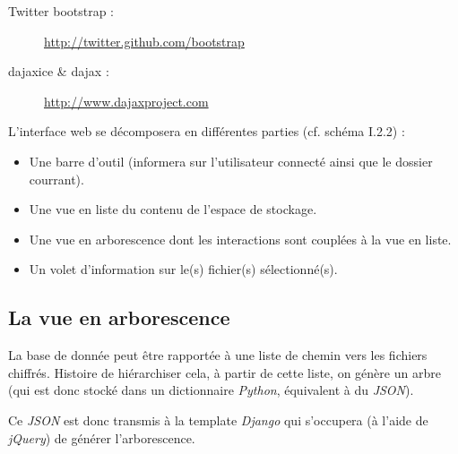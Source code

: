 \begin{description}
     \item[Twitter bootstrap :] \url{http://twitter.github.com/bootstrap}
     \item[dajaxice \& dajax :] \url{http://www.dajaxproject.com}
\end{description}


L'interface web se décomposera en différentes parties (cf. schéma I.2.2) :

\begin{itemize}
     \item Une barre d'outil (informera sur l'utilisateur connecté ainsi que le dossier courrant).
     \item Une vue en liste du contenu de l'espace de stockage.
     \item Une vue en arborescence dont les interactions sont couplées à la vue en liste.
     \item Un volet d'information sur le(s) fichier(s) sélectionné(s).
\end{itemize}

\subsection{La vue en arborescence}

La base de donnée peut être rapportée à une liste de chemin vers les fichiers chiffrés. Histoire
de hiérarchiser cela, à partir de cette liste, on génère un arbre (qui est donc stocké dans un
dictionnaire \textit{Python}, équivalent à du \textit{JSON}).

Ce \textit{JSON} est donc transmis à la template \textit{Django} qui s'occupera (à l'aide de \textit{jQuery})
de générer l'arborescence.


